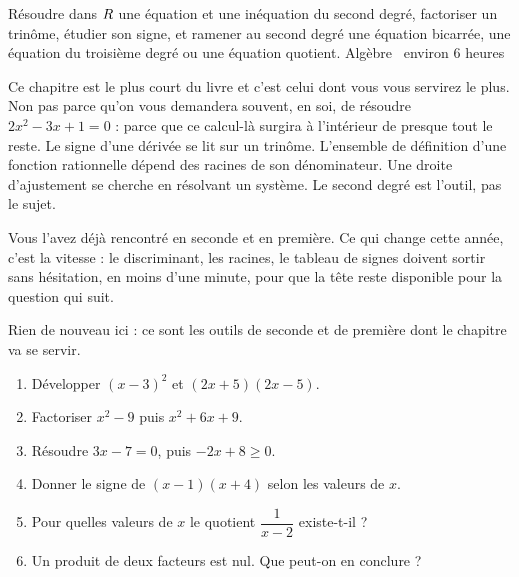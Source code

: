   {Résoudre dans $R$ une équation et une inéquation du second degré,
   factoriser un trinôme, étudier son signe, et ramener au second degré une
   équation bicarrée, une équation du troisième degré ou une équation
   quotient.}
  {Algèbre \textbullet\ environ 6 heures}

Ce chapitre est le plus court du livre et c'est celui dont vous vous servirez
le plus. Non pas parce qu'on vous demandera souvent, en soi, de résoudre
$2x^{2}-3x+1 = 0$ : parce que ce calcul-là surgira à l'intérieur de presque
tout le reste. Le signe d'une dérivée se lit sur un trinôme. L'ensemble de
définition d'une fonction rationnelle dépend des racines de son dénominateur.
Une droite d'ajustement se cherche en résolvant un système. Le second degré
est l'outil, pas le sujet.

Vous l'avez déjà rencontré en seconde et en première. Ce qui change cette
année, c'est la vitesse : le discriminant, les racines, le tableau de signes
doivent sortir sans hésitation, en moins d'une minute, pour que la tête reste
disponible pour la question qui suit.

\begin{revision}
Rien de nouveau ici : ce sont les outils de seconde et de première dont le
chapitre va se servir.

\begin{enumerate}[label=\textbf{\arabic*.}, leftmargin=*, itemsep=0.35em]
  \item Développer $(x-3)^{2}$ et $(2x+5)(2x-5)$.
  \item Factoriser $x^{2}-9$ puis $x^{2}+6x+9$.
  \item Résoudre $3x-7 = 0$, puis $-2x+8 \geq 0$.
  \item Donner le signe de $(x-1)(x+4)$ selon les valeurs de $x$.
  \item Pour quelles valeurs de $x$ le quotient $\dfrac{1}{x-2}$
        existe-t-il ?
  \item Un produit de deux facteurs est nul. Que peut-on en conclure ?
\end{enumerate}
\end{revision}

